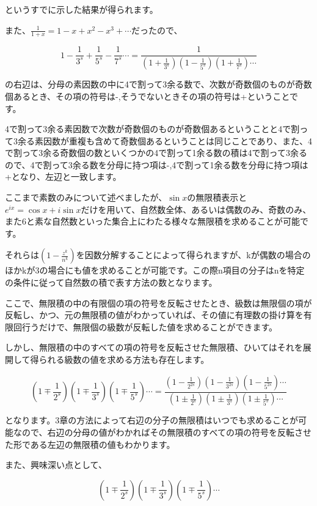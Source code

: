 \documentclass[./main]{subfiles}
\theoremstyle{break}
\begin{document}
というすでに示した結果が得られます。

また、$\frac{1}{1+x}=1-x+x^2-x^3+\cdots$だったので、

\[1-\frac{1}{3^s}+\frac{1}{5^s}-\frac{1}{7^s}\cdots =\frac{1}{\left( 1+\frac{1}{3^s} \right)\left( 1-\frac{1}{5^s} \right)\left( 1+\frac{1}{7^s} \right)\cdots}\]

の右辺は、分母の素因数の中に4で割って3余る数で、次数が奇数個のものが奇数個あるとき、その項の符号は-,そうでないときその項の符号は+ということです。

4で割って3余る素因数で次数が奇数個のものが奇数個あるということと4で割って3余る素因数が重複も含めて奇数個あるということは同じことであり、また、4で割って3余る奇数個の数といくつかの4で割って1余る数の積は4で割って3余るので、4で割って3余る数を分母に持つ項は-,4で割って1余る数を分母に持つ項は+となり、左辺と一致します。

ここまで素数のみについて述べましたが、$\sin x$の無限積表示と$e^{ix}=\cos x+i\sin x$だけを用いて、自然数全体、あるいは偶数のみ、奇数のみ、また6と素な自然数といった集合上にわたる様々な無限積を求めることが可能です。

それらは$\left( 1-\frac{z^k}{n^k} \right)$を因数分解することによって得られますが、kが偶数の場合のほかkが3の場合にも値を求めることが可能です。この際n項目の分子はnを特定の条件に従って自然数の積で表す方法の数となります。

ここで、無限積の中の有限個の項の符号を反転させたとき、級数は無限個の項が反転し、かつ、元の無限積の値がわかっていれば、その値に有理数の掛け算を有限回行うだけで、無限個の級数が反転した値を求めることができます。

しかし、無限積の中のすべての項の符号を反転させた無限積、ひいてはそれを展開して得られる級数の値を求める方法も存在します。

\[\left( 1\mp \frac{1}{2^s} \right)\left( 1\mp \frac{1}{3^s} \right)\left( 1\mp\frac{1}{5^s} \right)\cdots=\frac{\left( 1-\frac{1}{2^{2s}} \right)\left( 1-\frac{1}{3^{2s}} \right)\left( 1-\frac{1}{5^{2s}} \right)\cdots}{\left( 1\pm \frac{1}{2^s} \right)\left( 1\pm \frac{1}{3^s} \right)\left( 1\pm\frac{1}{5^s} \right)\cdots}\]

となります。3章の方法によって右辺の分子の無限積はいつでも求めることが可能なので、右辺の分母の値がわかればその無限積のすべての項の符号を反転させた形である左辺の無限積の値もわかります。

また、興味深い点として、

\[\left( 1\mp \frac{1}{2^s} \right)\left( 1\mp \frac{1}{3^s} \right)\left( 1\mp\frac{1}{5^s} \right)\cdots\]
\end{document}
